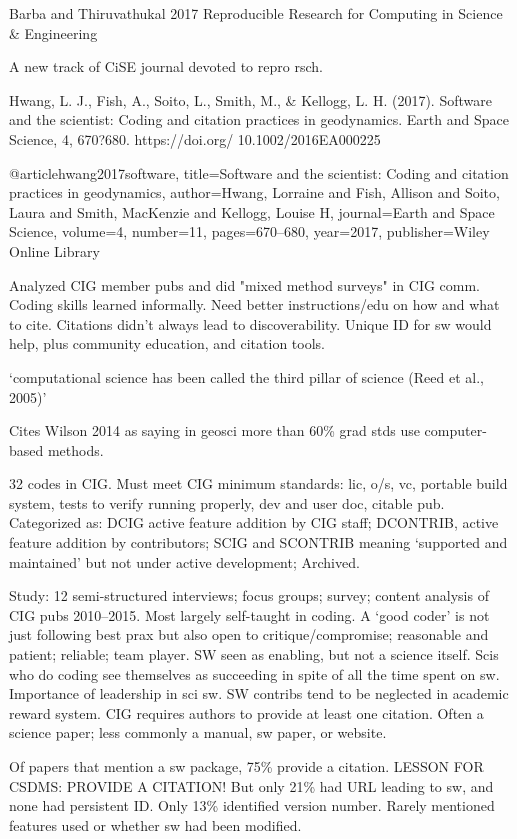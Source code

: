 \documentclass[12pt]{amsart}
\begin{document}
Barba and Thiruvathukal 2017 Reproducible Research for Computing in Science \& Engineering

A new track of CiSE journal devoted to repro rsch.



Hwang, L. J., Fish, A., Soito, L., Smith, M., \& Kellogg, L. H. (2017). Software and the scientist: Coding and citation practices in geodynamics. Earth and Space Science, 4, 670?680. https://doi.org/ 10.1002/2016EA000225

@article{hwang2017software,
  title={Software and the scientist: Coding and citation practices in geodynamics},
  author={Hwang, Lorraine and Fish, Allison and Soito, Laura and Smith, MacKenzie and Kellogg, Louise H},
  journal={Earth and Space Science},
  volume={4},
  number={11},
  pages={670--680},
  year={2017},
  publisher={Wiley Online Library}
}

Analyzed CIG member pubs and did "mixed method surveys" in CIG comm. Coding skills learned informally. Need better instructions/edu on how and what to cite. Citations didn't always lead to discoverability. Unique ID for sw would help, plus community education, and citation tools.

`computational science has been called the third pillar of science (Reed et al., 2005)'

Cites Wilson 2014 as saying in geosci more than 60\% grad stds use computer-based methods.

32 codes in CIG. Must meet CIG minimum standards: lic, o/s, vc, portable build system, tests to verify running properly, dev and user doc, citable pub. Categorized as: DCIG active feature addition by CIG staff; DCONTRIB, active feature addition by contributors; SCIG and SCONTRIB meaning `supported and maintained' but not under active development; Archived.

Study: 12 semi-structured interviews; focus groups; survey; content analysis of CIG pubs 2010--2015. Most largely self-taught in coding. A `good coder' is not just following best prax but also open to critique/compromise; reasonable and patient; reliable; team player. SW seen as enabling, but not a science itself. Scis who do coding see themselves as succeeding in spite of all the time spent on sw. Importance of leadership in sci sw. SW contribs tend to be neglected in academic reward system. CIG requires authors to provide at least one citation. Often a science paper; less commonly a manual, sw paper, or website. 

Of papers that mention a sw package, 75\% provide a citation. LESSON FOR CSDMS: PROVIDE A CITATION! But only 21\% had URL leading to sw, and none had persistent ID. Only 13\% identified version number. Rarely mentioned features used or whether sw had been modified.
\end{document}
